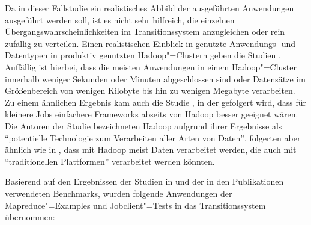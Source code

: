Da in dieser Fallstudie ein realistisches Abbild der ausgeführten Anwendungen ausgeführt werden soll, ist es nicht sehr hilfreich, die einzelnen Übergangswahrscheinlichkeiten im Transitionssystem anzugleichen oder rein zufällig zu verteilen.
Einen realistischen Einblick in genutzte Anwendungs- und Datentypen in produktiv genutzten Hadoop"=Clustern geben \uA die Studien \cite{Chen2012,HadoopDataTypes}.
Auffällig ist hierbei, dass die meisten Anwendungen in einem Hadoop"=Cluster innerhalb weniger Sekunden oder Minuten abgeschlossen sind oder Datensätze im Größenbereich von wenigen Kilobyte bis hin zu wenigen Megabyte verarbeiten.
Zu einem ähnlichen Ergebnis kam auch die Studie \cite{Ren2013}, in der gefolgert wird, dass für kleinere Jobs einfachere Frameworks abseits von Hadoop besser geeignet wären.
Die Autoren der Studie \cite{HadoopDataTypes} bezeichneten Hadoop aufgrund ihrer Ergebnisse als \enquote{potentielle Technologie zum Verarbeiten aller Arten von Daten}, folgerten aber ähnlich wie \citeauthor{Ren2013} in \cite{Ren2013}, dass mit Hadoop meist Daten verarbeitet werden, die auch mit \enquote{traditionellen Plattformen} verarbeitet werden könnten.

Basierend auf den Ergebnissen der Studien in \cite{Huang2010,Chen2012,HadoopDataTypes,Ren2013} und der in den Publikationen \cite{Shvachko2010,Dean2004,Graves2013} verwendeten Benchmarks, wurden folgende Anwendungen der Mapreduce"=Examples und Jobclient"=Tests in das Transitionssystem übernommen:

